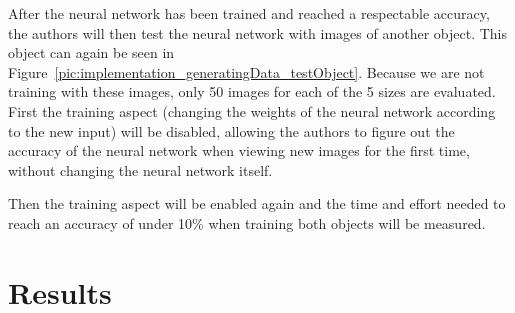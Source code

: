 After the neural network has been trained and reached a respectable accuracy, the authors will then test the neural network with images of another object. This object can again be seen in Figure~\ref{pic:implementation_generatingData_testObject}. Because we are not training with these images, only 50 images for each of the 5 sizes are evaluated. First the training aspect (changing the weights of the neural network according to the new input) will be disabled, allowing the authors to figure out the accuracy of the neural network when viewing new images for the first time, without changing the neural network itself.

Then the training aspect will be enabled again and the time and effort needed to reach an accuracy of under 10\% when training both objects will be measured.

\section{Results}

\filbreak